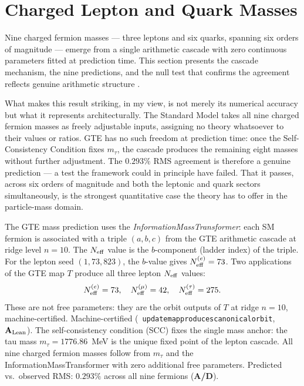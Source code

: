 \documentclass[11pt,openany]{book}
\theoremstyle{remark}
\newcommand{\lean}[1]{%
  \penalty-100
  \begingroup\def\_{\textunderscore\allowbreak}\texttt{#1}\endgroup}
\newcommand{\CatAL}{\ensuremath{\textbf{A}_{\rm Lean}}}
\newcommand{\CatAD}{\textbf{A/D}}
\begin{document}
\section{Charged Lepton and Quark Masses}
\label{sec:fermion_masses}

Nine charged fermion masses --- three leptons and six quarks, spanning six orders of
magnitude --- emerge from a single arithmetic cascade with zero continuous parameters
fitted at prediction time.  This section presents the cascade mechanism, the nine
predictions, and the null test that confirms the agreement reflects genuine arithmetic
structure \cite{Spivack2026_CyclotomicMass}.

What makes this result striking, in my view, is not merely its numerical accuracy
but what it represents architecturally.
The Standard Model takes all nine charged fermion masses as freely adjustable inputs,
assigning no theory whatsoever to their values or ratios.
GTE has no such freedom at prediction time: once the Self-Consistency Condition fixes
$m_\tau$, the cascade produces the remaining eight masses without further adjustment.
The $0.293\%$ RMS agreement is therefore a genuine prediction --- a test the framework
could in principle have failed.
That it passes, across six orders of magnitude and both the leptonic and quark sectors
simultaneously, is the strongest quantitative case the theory has to offer in the
particle-mass domain.

\begin{tcolorbox}[colback=blue!5,colframe=blue!50!black,
  title={How GTE Derives Particle Masses}]
The GTE mass prediction uses the \emph{InformationMassTransformer}: each SM fermion is
associated with a triple $(a, b, c)$ from the GTE arithmetic cascade at ridge level
$n = 10$.  The $N_{\rm eff}$ value is the $b$-component (ladder index) of the triple.
For the lepton seed $(1, 73, 823)$, the $b$-value gives $N_{\rm eff}^{(e)} = 73$.
Two applications of the GTE map $T$ produce all three lepton $N_{\rm eff}$ values:
\[
  N_{\rm eff}^{(e)} = 73,\quad N_{\rm eff}^{(\mu)} = 42,\quad N_{\rm eff}^{(\tau)} = 275.
\]
These are not free parameters: they are the orbit outputs of $T$ at ridge $n = 10$,
machine-certified.
Machine-certified \mbox{(\lean{update\_map\_produces\_canonical\_orbit}, \CatAL)}.
The self-consistency condition (SCC) fixes the single mass anchor: the tau mass
$m_\tau = 1776.86$~MeV is the unique fixed point of the lepton cascade.  All nine
charged fermion masses follow from $m_\tau$ and the InformationMassTransformer with
zero additional free parameters.  Predicted vs.\ observed RMS: $0.293\%$ across all
nine fermions (\CatAD).
\end{tcolorbox}
\end{document}
